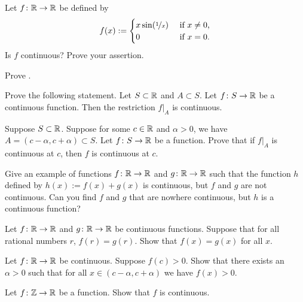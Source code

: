 \begin{exercise}
Let $f \colon {\mathbb{R}} \to {\mathbb{R}}$ be
defined by
\begin{equation*}
f(x) :=
\begin{cases}
x \sin(\nicefrac{1}{x}) & \text{ if $x \not= 0$,} \\
0 & \text{ if $x=0$.}
\end{cases}
\end{equation*}
Is $f$ continuous?  Prove your assertion.
\end{exercise}

\begin{exercise}
Prove .
\end{exercise}

\begin{exercise}
Prove the following statement.
Let $S \subset {\mathbb{R}}$ and $A \subset S$.  Let $f \colon S \to {\mathbb{R}}$
be a continuous function.
Then the restriction $f|_A$ is continuous.
\end{exercise}

\begin{exercise}
Suppose $S \subset {\mathbb{R}}$.  Suppose for some $c \in {\mathbb{R}}$
and $\alpha > 0$, we have $A=(c-\alpha,c+\alpha) \subset S$.
Let $f \colon S \to {\mathbb{R}}$ be a function.  Prove that
if $f|_A$ is continuous at $c$, then $f$ is continuous at $c$.
\end{exercise}

\begin{exercise}
Give an example of functions $f \colon {\mathbb{R}} \to {\mathbb{R}}$ and $g \colon {\mathbb{R}} \to {\mathbb{R}}$
such that the function $h$ defined by $h(x) := f(x) + g(x)$ is continuous,
but $f$ and $g$ are not continuous.  Can you find $f$ and $g$ that are nowhere
continuous, but $h$ is a continuous function?
\end{exercise}

\begin{exercise}
Let $f \colon {\mathbb{R}} \to {\mathbb{R}}$ and 
$g \colon {\mathbb{R}} \to {\mathbb{R}}$ be continuous functions.  Suppose that for
all rational numbers $r$, $f(r) = g(r)$.  Show that $f(x) = g(x)$ for all
$x$.
\end{exercise}

\begin{exercise} \label{exercise:positivecontneigh}
Let $f \colon {\mathbb{R}} \to {\mathbb{R}}$ be continuous.  Suppose $f(c) > 0$.  Show that
there exists an $\alpha > 0$ such that for all $x \in (c-\alpha,c+\alpha)$
we have $f(x) > 0$.
\end{exercise}

\begin{exercise}
Let $f \colon {\mathbb{Z}} \to {\mathbb{R}}$ be a function.  Show that $f$ is continuous.
\end{exercise}

